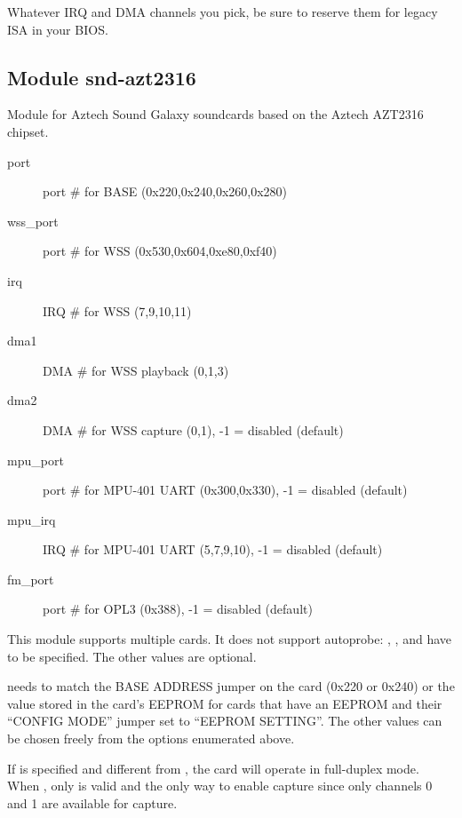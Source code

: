 \documentclass[a4paper,8pt,english]{sphinxmanual}
\begin{document}
Whatever IRQ and DMA channels you pick, be sure to reserve them for
legacy ISA in your BIOS.


\subsection{Module snd-azt2316}
\label{sound/alsa-configuration:module-snd-azt2316}
Module for Aztech Sound Galaxy soundcards based on the Aztech AZT2316
chipset.
\begin{description}
\item[{port}] \leavevmode
port \# for BASE (0x220,0x240,0x260,0x280)

\item[{wss\_port}] \leavevmode
port \# for WSS (0x530,0x604,0xe80,0xf40)

\item[{irq}] \leavevmode
IRQ \# for WSS (7,9,10,11)

\item[{dma1}] \leavevmode
DMA \# for WSS playback (0,1,3)

\item[{dma2}] \leavevmode
DMA \# for WSS capture (0,1), -1 = disabled (default)

\item[{mpu\_port}] \leavevmode
port \# for MPU-401 UART (0x300,0x330), -1 = disabled (default)

\item[{mpu\_irq}] \leavevmode
IRQ \# for MPU-401 UART (5,7,9,10), -1 = disabled (default)

\item[{fm\_port}] \leavevmode
port \# for OPL3 (0x388), -1 = disabled (default)

\end{description}

This module supports multiple cards. It does not support autoprobe:
, ,  and  have to be specified.
The other values are optional.

 needs to match the BASE ADDRESS jumper on the card (0x220 or 0x240)
or the value stored in the card's EEPROM for cards that have an EEPROM and
their ``CONFIG MODE'' jumper set to ``EEPROM SETTING''. The other values can
be chosen freely from the options enumerated above.

If  is specified and different from , the card will operate in
full-duplex mode. When , only  is valid and the only way to
enable capture since only channels 0 and 1 are available for capture.
\end{document}

